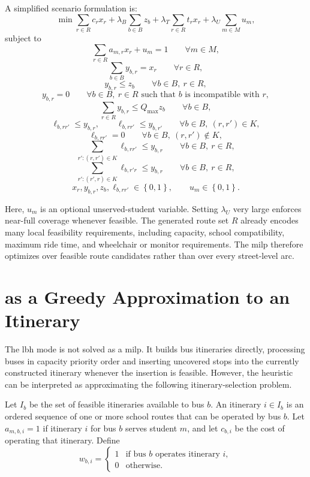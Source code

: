 A simplified scenario formulation is:
\[
\min
\sum_{r\in R} c_r x_r
+ \lambda_B \sum_{b\in B} z_b
+ \lambda_T \sum_{r\in R} t_r x_r
+ \lambda_U \sum_{m\in M} u_m ,
\]
subject to
\[
\sum_{r\in R} a_{m,r}x_r + u_m = 1
\qquad \forall m\in M,
\]
\[
\sum_{b\in B} y_{b,r} = x_r
\qquad \forall r\in R,
\]
\[
y_{b,r} \le z_b
\qquad \forall b\in B,\ r\in R,
\]
\[
y_{b,r} = 0
\qquad \forall b\in B,\ r\in R \text{ such that } b \text{ is incompatible with } r,
\]
\[
\sum_{r\in R} y_{b,r} \le Q_{\max} z_b
\qquad \forall b\in B,
\]
\[
\ell_{b,rr'} \le y_{b,r},
\qquad
\ell_{b,rr'} \le y_{b,r'}
\qquad \forall b\in B,\ \left(r,r'\right)\in K,
\]
\[
\ell_{b,rr'} = 0
\qquad \forall b\in B,\ \left(r,r'\right)\notin K,
\]
\[
\sum_{r':\left(r,r'\right)\in K} \ell_{b,rr'} \le y_{b,r}
\qquad \forall b\in B,\ r\in R,
\]
\[
\sum_{r':\left(r',r\right)\in K} \ell_{b,r'r} \le y_{b,r}
\qquad \forall b\in B,\ r\in R,
\]
\[
x_r,y_{b,r},z_b,\ell_{b,rr'}\in\left\{0,1\right\},
\qquad
u_m\in\left\{0,1\right\}.
\]

Here, $u_m$ is an optional unserved-student variable. Setting $\lambda_U$ very large enforces near-full coverage whenever feasible. The generated route set $R$ already encodes many local feasibility requirements, including capacity, school compatibility, maximum ride time, and wheelchair or monitor requirements. The \gls{milp} therefore optimizes over feasible route candidates rather than over every street-level arc.

\section{ as a Greedy Approximation to an Itinerary }

The \gls{lbh} mode is not solved as a \gls{milp}. It builds bus itineraries directly, processing buses in capacity priority order and inserting uncovered stops into the currently constructed itinerary whenever the insertion is feasible. However, the heuristic can be interpreted as approximating the following itinerary-selection problem.

Let $I_b$ be the set of feasible itineraries available to bus $b$. An itinerary $i\in I_b$ is an ordered sequence of one or more school routes that can be operated by bus $b$. Let $a_{m,b,i}=1$ if itinerary $i$ for bus $b$ serves student $m$, and let $c_{b,i}$ be the cost of operating that itinerary. Define
\[
w_{b,i} =
\begin{cases}
1 & \text{if bus } b \text{ operates itinerary } i,\\
0 & \text{otherwise.}
\end{cases}
\]

